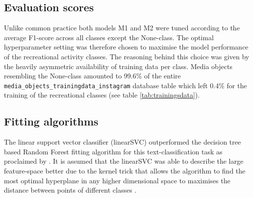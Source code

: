 \subsection{Evaluation scores}
Unlike common practice \parencite{Guido2016} both models M1 and M2 were tuned according to the average F1-score across all classes except the None-class. The optimal hyperparameter setting was therefore chosen to maximise the model performance of the recreational activity classes. The reasoning behind this choice was given by the heavily asymmetric availability of training data per class. Media objects resembling the None-class amounted to 99.6\% of the entire \texttt{media\_objects\_trainingdata\_instagram} database table which left 0.4\% for the training of the recreational classes (see table \ref{tab:trainingsdata}).

\subsection{Fitting algorithms}
The linear support vector classifier (linearSVC) outperformed the decision tree based Random Forest fitting algorithm for this text-classification task as proclaimed by \parencite{Guido2016}. It is assumed that the linearSVC was able to describe the large feature-space better due to the kernel trick that allows the algorithm to find the most optimal hyperplane in any higher dimensional space to maximises the distance between points of different classes \parencite{Shawe-Taylor2004}.

